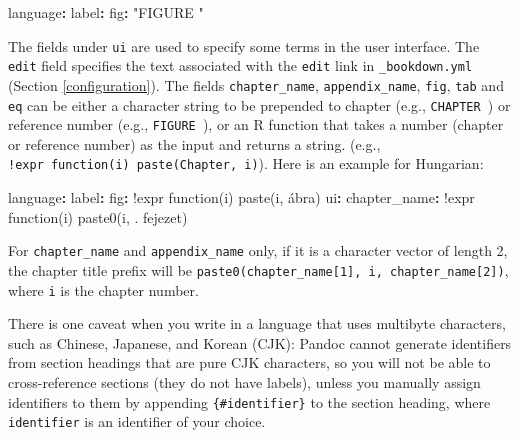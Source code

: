 \documentclass[
  12pt,
]{krantz}
\newenvironment{Shaded}{\begin{snugshade}}{\end{snugshade}}
\newcommand{\AttributeTok}[1]{\textcolor[rgb]{0.77,0.63,0.00}{#1}}
\newcommand{\FunctionTok}[1]{\textcolor[rgb]{0.00,0.00,0.00}{#1}}
\newcommand{\KeywordTok}[1]{\textcolor[rgb]{0.13,0.29,0.53}{\textbf{#1}}}
\newcommand{\StringTok}[1]{\textcolor[rgb]{0.31,0.60,0.02}{#1}}
\theoremstyle{definition}
\theoremstyle{definition}
\theoremstyle{definition}
\theoremstyle{definition}
\theoremstyle{remark}
\begin{document}
\begin{Shaded}
\begin{Highlighting}[]
\FunctionTok{language}\KeywordTok{:}
\AttributeTok{  }\FunctionTok{label}\KeywordTok{:}
\AttributeTok{    }\FunctionTok{fig}\KeywordTok{:}\AttributeTok{ }\StringTok{"FIGURE "}
\end{Highlighting}
\end{Shaded}

The fields under \texttt{ui} are used to specify some terms in the user interface. The \texttt{edit} field specifies the text associated with the \texttt{edit} link in \texttt{\_bookdown.yml} (Section \ref{configuration}). The fields \texttt{chapter\_name}, \texttt{appendix\_name}, \texttt{fig}, \texttt{tab} and \texttt{eq} can be either a character string to be prepended to chapter (e.g., \texttt{\textquotesingle{}CHAPTER\ \textquotesingle{}}) or reference number (e.g., \texttt{\textquotesingle{}FIGURE\ \textquotesingle{}}), or an R function that takes a number (chapter or reference number) as the input and returns a string. (e.g., \texttt{!expr\ function(i)\ paste(\textquotesingle{}Chapter\textquotesingle{},\ i)}). Here is an example for Hungarian:

\begin{Shaded}
\begin{Highlighting}[]
\FunctionTok{language}\KeywordTok{:}
\AttributeTok{  }\FunctionTok{label}\KeywordTok{:}
\AttributeTok{    }\FunctionTok{fig}\KeywordTok{:}\AttributeTok{ !expr function(i) paste(i, \textquotesingle{}ábra\textquotesingle{})}
\AttributeTok{  }\FunctionTok{ui}\KeywordTok{:}
\AttributeTok{    }\FunctionTok{chapter\_name}\KeywordTok{:}\AttributeTok{ !expr function(i) paste0(i, \textquotesingle{}. fejezet\textquotesingle{})}
\end{Highlighting}
\end{Shaded}

For \texttt{chapter\_name} and \texttt{appendix\_name} only, if it is a character vector of length 2, the chapter title prefix will be \texttt{paste0(chapter\_name{[}1{]},\ i,\ chapter\_name{[}2{]})}, where \texttt{i} is the chapter number.

There is one caveat when you write in a language that uses multibyte characters, such as Chinese, Japanese, and Korean (CJK): Pandoc cannot generate identifiers from section headings that are pure CJK characters, so you will not be able to cross-reference sections (they do not have labels), unless you manually assign identifiers to them by appending \texttt{\{\#identifier\}} to the section heading, where \texttt{identifier} is an identifier of your choice.
\end{document}
